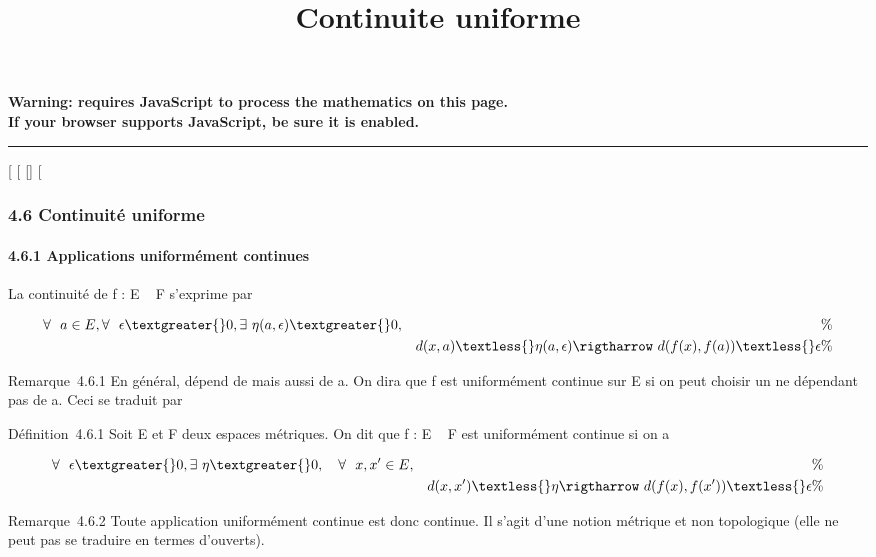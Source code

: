 \documentclass[]{article}
\title{Continuite uniforme}
\author{}
\date{}
\begin{document}
\maketitle

\textbf{Warning: 
requires JavaScript to process the mathematics on this page.\\ If your
browser supports JavaScript, be sure it is enabled.}

\begin{center}\rule{3in}{0.4pt}\end{center}

{[}
{[}
{[}{]}
{[}

\subsubsection{4.6 Continuité uniforme}

\paragraph{4.6.1 Applications uniformément continues}

La continuité de f : E \rightarrow~ F s'exprime par

\begin{align*} \forall~~a \in
E,\forall~~\epsilon \textgreater{} 0,
\exists~\eta(a,\epsilon) \textgreater{} 0,&& \%&
\\ & & d(x,a) \textless{} \eta(a,\epsilon) \rigtharrow~
d(f(x),f(a)) \textless{} \epsilon\%& \\
\end{align*}

Remarque~4.6.1 En général, \eta dépend de \epsilon mais aussi de a. On dira que f
est uniformément continue sur E si on peut choisir un \eta ne dépendant pas
de a. Ceci se traduit par

Définition~4.6.1 Soit E et F deux espaces métriques. On dit que f : E \rightarrow~
F est uniformément continue si on a

\begin{align*} \forall~~\epsilon
\textgreater{} 0,\exists~\eta \textgreater{}
0,\quad \forall~~x,x' \in E,&& \%&
\\ & & d(x,x') \textless{} \eta \rigtharrow~
d(f(x),f(x')) \textless{} \epsilon\%& \\
\end{align*}

Remarque~4.6.2 Toute application uniformément continue est donc
continue. Il s'agit d'une notion métrique et non topologique (elle ne
peut pas se traduire en termes d'ouverts).
\end{document}
